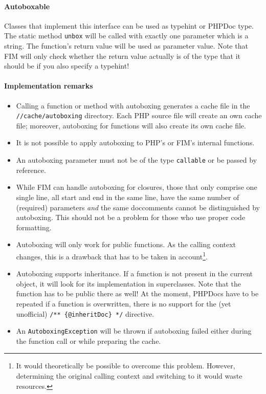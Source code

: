 \documentclass{scrartcl}
\begin{document}
      \paragraph{Autoboxable}
         Classes that implement this interface can be used as typehint or PHPDoc type. The static method \lstinline!unbox! will be called with exactly one parameter which is a string. The function's return value will be used as parameter value. Note that FIM will only check whether the return value actually is of the type that it should be if you also specify a typehint!
      \paragraph{Implementation remarks}
         \begin{itemize}
            \item
               Calling a function or method with autoboxing generates a cache file in the \texttt{//cache/autoboxing} directory. Each PHP source file will create an own cache file; moreover, autoboxing for functions will also create its own cache file.
            \item
               It is not possible to apply autoboxing to PHP's or FIM's internal functions.
            \item
               An autoboxing parameter must not be of the type \texttt{callable} or be passed by reference.
            \item
               While FIM can handle autoboxing for closures, those that only comprise one single line, all start and end in the same line, have the same number of (required) parameters \emph{and} the same doccomments cannot be distinguished by autoboxing. This should not be a problem for those who use proper code formatting.
            \item
               Autoboxing will only work for public functions. As the calling context changes, this is a drawback that has to be taken in account\footnote{It would theoretically be possible to overcome this problem. However, determining the original calling context and switching to it would waste resources.}.
            \item
               Autoboxing supports inheritance. If a function is not present in the current object, it will look for its implementation in superclasses. Note that the function has to be public there as well! At the moment, PHPDocs have to be repeated if a function is overwritten, there is no support for the (yet unofficial) \lstinline!/** {@inheritDoc} */! directive.
            \item
               An \lstinline!AutoboxingException! will be thrown if autoboxing failed either during the function call or while preparing the cache.
         \end{itemize}
\end{document}

